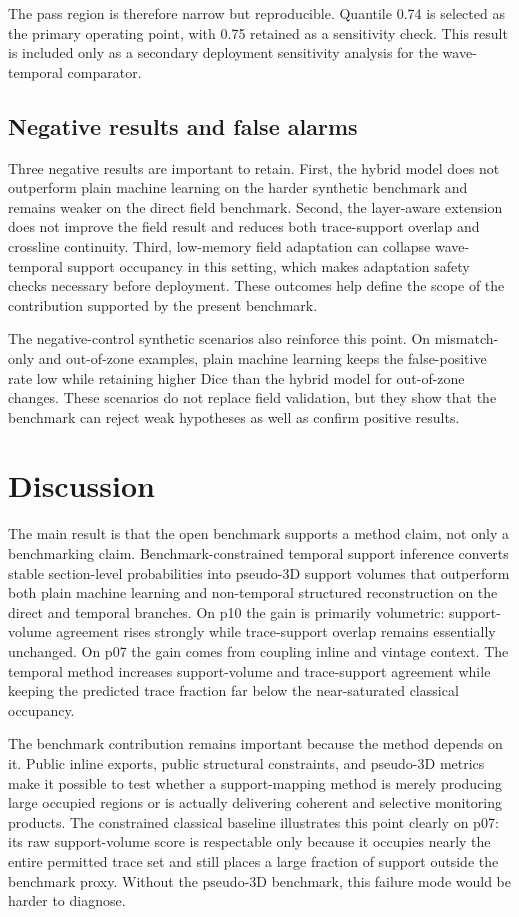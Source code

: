 \documentclass[preprint,12pt]{elsarticle}
\begin{document}
The pass region is therefore narrow but reproducible. Quantile 0.74 is selected as the primary operating point, with 0.75 retained as a sensitivity check. This result is included only as a secondary deployment sensitivity analysis for the wave-temporal comparator.

\subsection{Negative results and false alarms}

Three negative results are important to retain. First, the hybrid model does not outperform plain machine learning on the harder synthetic benchmark and remains weaker on the direct field benchmark. Second, the layer-aware extension does not improve the field result and reduces both trace-support overlap and crossline continuity. Third, low-memory field adaptation can collapse wave-temporal support occupancy in this setting, which makes adaptation safety checks necessary before deployment. These outcomes help define the scope of the contribution supported by the present benchmark.

The negative-control synthetic scenarios also reinforce this point. On mismatch-only and out-of-zone examples, plain machine learning keeps the false-positive rate low while retaining higher Dice than the hybrid model for out-of-zone changes. These scenarios do not replace field validation, but they show that the benchmark can reject weak hypotheses as well as confirm positive results.

\section{Discussion}

The main result is that the open benchmark supports a method claim, not only a benchmarking claim. Benchmark-constrained temporal support inference converts stable section-level probabilities into pseudo-3D support volumes that outperform both plain machine learning and non-temporal structured reconstruction on the direct and temporal branches. On p10 the gain is primarily volumetric: support-volume agreement rises strongly while trace-support overlap remains essentially unchanged. On p07 the gain comes from coupling inline and vintage context. The temporal method increases support-volume and trace-support agreement while keeping the predicted trace fraction far below the near-saturated classical occupancy.

The benchmark contribution remains important because the method depends on it. Public inline exports, public structural constraints, and pseudo-3D metrics make it possible to test whether a support-mapping method is merely producing large occupied regions or is actually delivering coherent and selective monitoring products. The constrained classical baseline illustrates this point clearly on p07: its raw support-volume score is respectable only because it occupies nearly the entire permitted trace set and still places a large fraction of support outside the benchmark proxy. Without the pseudo-3D benchmark, this failure mode would be harder to diagnose.
\end{document}

